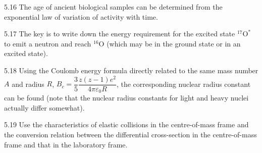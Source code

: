\begin{hint}{5.16}
The age of ancient biological samples can be determined from the exponential law of variation of activity with time.
\end{hint}

\begin{hint}{5.17}
The key is to write down the energy requirement for the excited state $^{17}\mathrm{O}^*$ to emit a neutron and reach $^{16}\mathrm{O}$ (which may be in the ground state or in an excited state).
\end{hint}

\begin{hint}{5.18}
Using the Coulomb energy formula directly related to the same mass number $A$ and radius $R$, $B_c=\dfrac35\dfrac{z(z-1)e^2}{4\pi\varepsilon_0R}$, the corresponding nuclear radius constant can be found (note that the nuclear radius constants for light and heavy nuclei actually differ somewhat).
\end{hint}

\begin{hint}{5.19}
Use the characteristics of elastic collisions in the centre-of-mass frame and the conversion relation between the differential cross-section in the centre-of-mass frame and that in the laboratory frame.
\end{hint}
